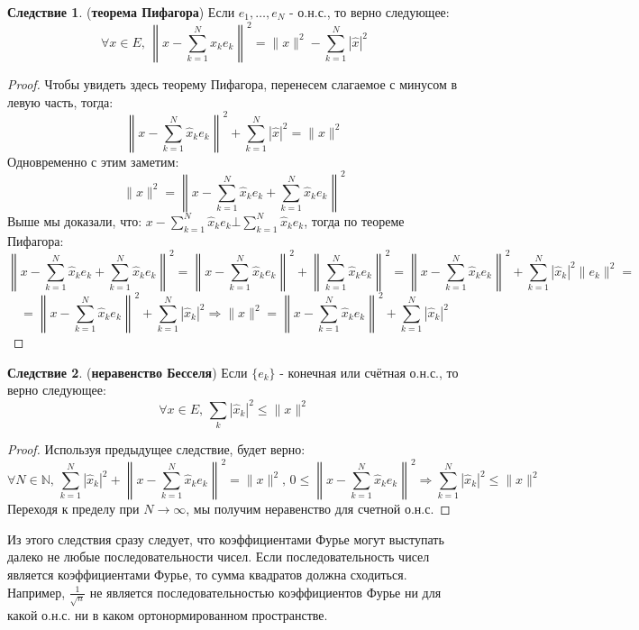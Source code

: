 \documentclass[12pt]{article}
\newcommand{\MN}{\mathbb{N}}
\theoremstyle{definition}
\newtheorem{corollary}{Следствие}
\newcommand{\ddsum}[2]{\displaystyle\sum\limits_{#1}^{#2}}
\begin{document}
\begin{corollary}(\textbf{теорема Пифагора}) 
	Если $e_1, \dotsc, e_N$ - о.н.с., то верно следующее:
	$$
		\forall x \in E, \, \left\|x - \ddsum{k = 1}{N}\hat{x}_k e_k \right\|^2 = \|x\|^2 - \ddsum{k = 1}{N}\left|\hat{x}\right|^2
	$$
\end{corollary}
\begin{proof}
	Чтобы увидеть здесь теорему Пифагора, перенесем слагаемое с минусом в левую часть, тогда:
	$$
		\left\|x - \ddsum{k = 1}{N}\hat{x}_k e_k \right\|^2 + \ddsum{k = 1}{N}\left|\hat{x}\right|^2 = \|x\|^2
	$$	
	Одновременно с этим заметим:
	$$
		\|x\|^2 = \left\|x - \ddsum{k = 1}{N}\hat{x}_k e_k + \ddsum{k = 1}{N}\hat{x}_k e_k\right\|^2
	$$
	Выше мы доказали, что: $x - \ddsum{k = 1}{N}\hat{x}_k e_k \bot \ddsum{k = 1}{N}\hat{x}_k e_k$, тогда по теореме Пифагора:
	$$
		\left\|x - \ddsum{k = 1}{N}\hat{x}_k e_k + \ddsum{k = 1}{N}\hat{x}_k e_k\right\|^2 = \left\|x - \ddsum{k = 1}{N}\hat{x}_k e_k\right\|^2 + \left\|\ddsum{k = 1}{N}\hat{x}_k e_k\right\|^2 = \left\|x - \ddsum{k = 1}{N}\hat{x}_k e_k\right\|^2 + \ddsum{k = 1}{N}\left|\hat{x}_k\right|^2\|e_k\|^2 =
	$$
	$$
		=	\left\|x - \ddsum{k = 1}{N}\hat{x}_k e_k\right\|^2 + \ddsum{k = 1}{N}\left|\hat{x}_k\right|^2 \Rightarrow \|x\|^2 = \left\|x - \ddsum{k = 1}{N}\hat{x}_k e_k\right\|^2 + \ddsum{k = 1}{N}\left|\hat{x}_k\right|^2
	$$
\end{proof}
\begin{corollary}(\textbf{неравенство Бесселя})
	Если $\{e_k\}$ - конечная или счётная о.н.с., то верно следующее:
	$$
		\forall x \in E, \, \ddsum{k}{}|\hat{x}_k|^2 \leq \|x\|^2
	$$
\end{corollary}
\begin{proof}
	Используя предыдущее следствие, будет верно:
	$$
		\forall N \in \MN, \, \ddsum{k = 1}{N}\left|\hat{x}_k\right|^2 + \left\|x - \ddsum{k = 1}{N}\hat{x}_k e_k \right\|^2 = \|x\|^2, \, 0 \leq \left\|x - \ddsum{k = 1}{N}\hat{x}_k e_k \right\|^2  \Rightarrow \ddsum{k = 1}{N}\left|\hat{x}_k\right|^2  \leq \|x\|^2
	$$
	Переходя к пределу при $N \to \infty$, мы получим неравенство для счетной о.н.с.
\end{proof}
Из этого следствия сразу следует, что коэффициентами Фурье могут выступать далеко не любые последовательности чисел. Если последовательность чисел является коэффициентами Фурье, то сумма квадратов должна сходиться. Например, $\tfrac{1}{\sqrt{n}}$ не является последовательностью коэффициентов Фурье ни для какой о.н.с. ни в каком ортонормированном пространстве.
\end{document}
